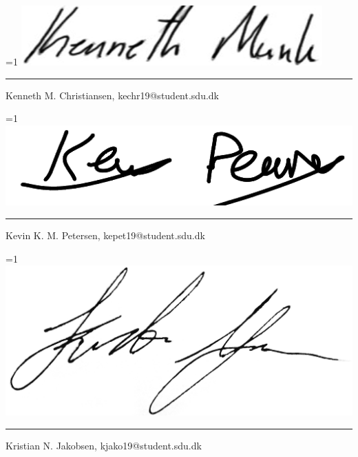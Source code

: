 \noindent
\ifnum \value{PROD}=1
    \includegraphics[scale=0.3]{figures/signatures/signature_kechr19.PNG}
    \vspace{-5mm}
\fi
\par\noindent\rule{\textwidth}{0.4pt}
\noindent
Kenneth M. Christiansen, kechr19@student.sdu.dk\\
\vspace{3.5mm}

\vspace{-6.5mm}
\noindent
\ifnum \value{PROD}=1
    \includegraphics[scale=0.3]{figures/signatures/signature_kepet19.png}
    \vspace{-8mm}
\fi
\par\noindent\rule{\textwidth}{0.4pt}
\noindent
Kevin K. M. Petersen, kepet19@student.sdu.dk

\noindent
\ifnum \value{PROD}=1
    \includegraphics[scale=0.04]{figures/signatures/signature_kjako19.jpg}
    \vspace{-9.5mm}
\fi
\par\noindent\rule{\textwidth}{0.4pt}
\noindent
Kristian N. Jakobsen, kjako19@student.sdu.dk\\

